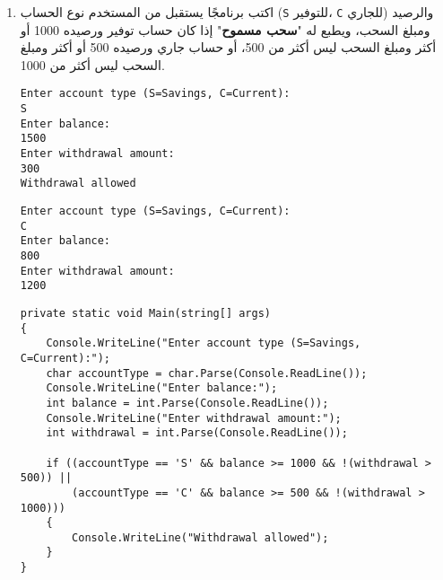 \documentclass[12pt]{article}
\begin{document}
\begin{enumerate}[itemsep=3em]
\begin{enumerate}[itemsep=3em]
\begin{enumerate}[itemsep=3em]
\begin{enumerate}[itemsep=3em]
\begin{enumerate}[itemsep=3em]
\begin{enumerate}[itemsep=3em]
\begin{enumerate}[itemsep=3em]
\begin{enumerate}
\item
اكتب برنامجًا يستقبل من المستخدم نوع الحساب (\texttt{S} للتوفير، \texttt{C} للجاري) والرصيد ومبلغ السحب، ويطبع له "\textbf{سحب مسموح}" إذا كان حساب توفير ورصيده 1000 أو أكثر ومبلغ السحب ليس أكثر من 500، أو حساب جاري ورصيده 500 أو أكثر ومبلغ السحب ليس أكثر من 1000.
\ifdetailed
\begin{example}[1]
\begin{english}
\begin{lstlisting}
Enter account type (S=Savings, C=Current):
S
Enter balance:
1500
Enter withdrawal amount:
300
Withdrawal allowed
\end{lstlisting}
\end{english}
\end{example}
\begin{example}[2]
\begin{english}
\begin{lstlisting}
Enter account type (S=Savings, C=Current):
C
Enter balance:
800
Enter withdrawal amount:
1200
\end{lstlisting}
\end{english}
\end{example}

\ifwithsols
\begin{solution}
\begin{english}
\begin{lstlisting}
private static void Main(string[] args)
{
    Console.WriteLine("Enter account type (S=Savings, C=Current):");
    char accountType = char.Parse(Console.ReadLine());
    Console.WriteLine("Enter balance:");
    int balance = int.Parse(Console.ReadLine());
    Console.WriteLine("Enter withdrawal amount:");
    int withdrawal = int.Parse(Console.ReadLine());

    if ((accountType == 'S' && balance >= 1000 && !(withdrawal > 500)) ||
        (accountType == 'C' && balance >= 500 && !(withdrawal > 1000)))
    {
        Console.WriteLine("Withdrawal allowed");
    }
}
\end{lstlisting}
\end{english}
\end{solution}
\clearpage
\fi
\fi


\end{enumerate}
\end{enumerate}
\end{enumerate}
\end{enumerate}
\end{enumerate}
\end{enumerate}
\end{enumerate}
\end{enumerate}
\end{document}
